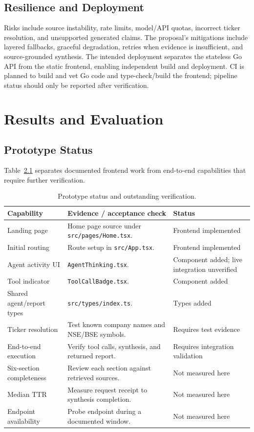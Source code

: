 \documentclass[12pt,a4paper,oneside]{report}
\begin{document}
\section{Resilience and Deployment}
Risks include source instability, rate limits, model/API quotas, incorrect ticker resolution, and unsupported generated claims. The proposal's mitigations include layered fallbacks, graceful degradation, retries when evidence is insufficient, and source-grounded synthesis. The intended deployment separates the stateless Go API from the static frontend, enabling independent build and deployment. CI is planned to build and vet Go code and type-check/build the frontend; pipeline status should only be reported after verification.

\chapter{Results and Evaluation}
\label{chap:results}
\section{Prototype Status}
Table~\ref{tab:status} separates documented frontend work from end-to-end capabilities that require further verification.
\begin{table}[H]\centering\small
\begin{tabularx}{\textwidth}{>{\raggedright\arraybackslash}p{3.2cm}X>{\raggedright\arraybackslash}p{2.5cm}}
\toprule \textbf{Capability} & \textbf{Evidence / acceptance check} & \textbf{Status}\\\midrule
Landing page & Home page source under \texttt{src/pages/Home.tsx}. & Frontend implemented\\
Initial routing & Route setup in \texttt{src/App.tsx}. & Frontend implemented\\
Agent activity UI & \texttt{AgentThinking.tsx}. & Component added; live integration unverified\\
Tool indicator & \texttt{ToolCallBadge.tsx}. & Component added\\
Shared agent/report types & \texttt{src/types/index.ts}. & Types added\\
Ticker resolution & Test known company names and NSE/BSE symbols. & Requires test evidence\\
End-to-end execution & Verify tool calls, synthesis, and returned report. & Requires integration validation\\
Six-section completeness & Review each section against retrieved sources. & Not measured here\\
Median TTR & Measure request receipt to synthesis completion. & Not measured here\\
Endpoint availability & Probe endpoint during a documented window. & Not measured here\\
\bottomrule
\end{tabularx}
\caption{Prototype status and outstanding verification.}
\label{tab:status}
\end{table}
\end{document}
